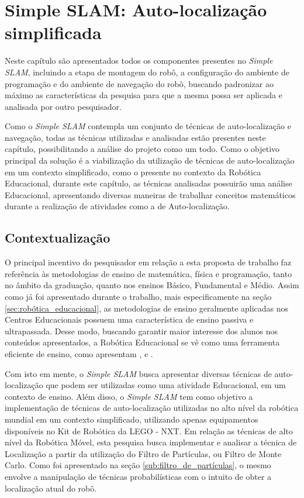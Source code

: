 \chapter[Simple SLAM]{Simple SLAM: Auto-localização simplificada}

Neste capítulo são apresentados todos os componentes presentes no \textit{Simple SLAM}, incluindo a etapa de montagem do robô, a configuração do ambiente de programação e do ambiente de navegação do robô, buscando padronizar ao máximo as características da pesquisa para que a mesma possa ser aplicada e analisada por outro pesquisador.

Como o \textit{Simple SLAM} contempla um conjunto de técnicas de auto-localização e navegação, todas as técnicas utilizadas e analisadas estão presentes neste capítulo, possibilitando a análise do projeto como um todo. Como o objetivo principal da solução é a viabilização da utilização de técnicas de auto-localização em um contexto simplificado, como o presente no contexto da Robótica Educacional, durante este capítulo, as técnicas analisadas possuirão uma análise Educacional, apresentando diversas maneiras de trabalhar conceitos matemáticos durante a realização de atividades como a de Auto-localização.

\section{Contextualização}

	O principal incentivo do pesquisador em relação a esta proposta de trabalho faz referência às metodologias de ensino de matemática, física e programação, tanto no âmbito da graduação, quanto nos ensinos Básico, Fundamental e Médio. Assim como já foi apresentado durante o trabalho, mais especificamente na seção \ref{sec:robótica_educacional}, as metodologias de ensino geralmente aplicadas nos Centros Educacionais possuem uma característica de ensino passiva e ultrapassada. Desse modo, buscando garantir maior interesse dos alunos nos conteúdos apresentados, a Robótica Educacional se vê como uma ferramenta eficiente de ensino, como apresentam \cite{teachingWithRoboticKit}, \cite{construcionismoPapert} e \cite{roboticaEducativaEnsinoMedio}.

	Com isto em mente, o \textit{Simple SLAM} busca apresentar diversas técnicas de auto-localização que podem ser utilizadas como uma atividade Educacional, em um contexto de ensino. Além disso, o \textit{Simple SLAM} tem como objetivo a implementação de técnicas de auto-localização utilizadas no alto nível da robótica mundial em um contexto simplificado, utilizando apenas equipamentos disponíveis no Kit de Robótica da LEGO - NXT.
  Em relação as técnicas de alto nível da Robótica Móvel, esta pesquisa busca implementar e analisar a técnica de Localização a partir da utilização
	do Filtro de Partículas, ou Filtro de Monte Carlo. Como foi apresentado na seção \ref{sub:filtro_de_partículas}, o mesmo envolve
	a manipulação de técnicas probabilísticas com o intuito de obter a localização atual do robô.

